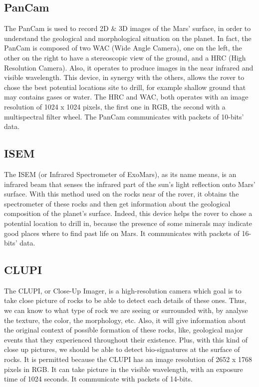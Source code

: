\documentclass[12pt,a4paper]{article}
\begin{document}
\subsection{PanCam}
The PanCam is used to record 2D \& 3D images of the Mars' surface, in order to understand the geological and morphological situation on the planet. In fact, the PanCam is composed of two WAC (Wide Angle Camera), one on the left, the other on the right to have a stereoscopic view of the ground, and a HRC (High Resolution Camera). Also, it operates to produce images in the near infrared and visible wavelength. This device, in synergy with the others, allows the rover to chose the best potential locations site to drill, for example shallow ground that may contains gases or water. The HRC and WAC, both operates with an image resolution of 1024 x 1024 pixels, the first one in RGB, the second with a multispectral filter wheel. The PanCam communicates with packets of 10-bits' data.
\pagebreak

\subsection{ISEM}

The ISEM (or Infrared Spectrometer of ExoMars), as its name means, is an infrared beam that senses the infrared part of the sun's light reflection onto Mars' surface. With this method used on the rocks near of the rover, it obtains the spectrometer of these rocks and then get information about the geological composition of the planet's surface. Indeed, this device helps the rover to chose a potential location to drill in, because the presence of some minerals may indicate good places where to find past life on Mars. It communicates with packets of 16-bits' data.

\subsection{CLUPI}

The CLUPI, or Close-Up Imager, is a high-resolution camera which goal is to take close picture of rocks to be able to detect each details of these ones. Thus, we can know to what type of rock we are seeing or surrounded with, by analyse the texture, the color, the morphology, etc. Also, it will give information about the original context of possible formation of these rocks, like, geological major events that they experienced throughout their existence. Plus, with this kind of close up pictures, we should be able to detect bio-signatures at the surface of rocks. It is permitted because the CLUPI has an image resolution of 2652 x 1768 pixels in RGB. It can take picture in the visible wavelength, with an exposure time of 1024 seconds. It communicate with packets of 14-bits.
\end{document}
